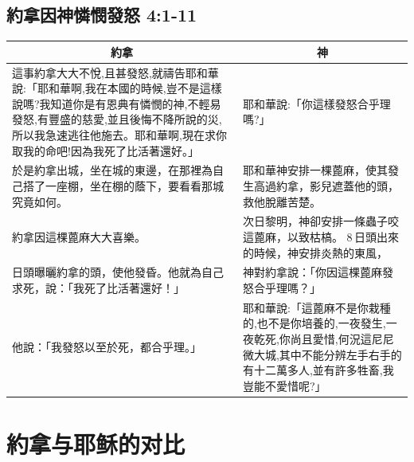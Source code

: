 \subsection{約拿因神憐憫發怒 4:1-11}
\begin{table}[H]
\centering
\begin{tabular}{p{8.25cm}|p{9.25cm}}\hline\hline
\multicolumn{1}{c|}{約拿}&\multicolumn{1}{c}{神}\\\hline
這事約拿大大不悅,且甚發怒,就禱告耶和華說:「耶和華啊,我在本國的時候,豈不是這樣說嗎?我知道你是有恩典有憐憫的神,不輕易發怒,有豐盛的慈愛,並且後悔不降所說的災,所以我急速逃往他施去。耶和華啊,現在求你取我的命吧!因為我死了比活著還好。」&耶和華說:「你這樣發怒合乎理嗎?」\\\hline
於是約拿出城，坐在城的東邊，在那裡為自己搭了一座棚，坐在棚的蔭下，要看看那城究竟如何。&耶和華神安排一棵蓖麻，使其發生高過約拿，影兒遮蓋他的頭，救他脫離苦楚。\\\hline
約拿因這棵蓖麻大大喜樂。&次日黎明，神卻安排一條蟲子咬這蓖麻，以致枯槁。 8 日頭出來的時候，神安排炎熱的東風，\\\hline
日頭曝曬約拿的頭，使他發昏。他就為自己求死，說：「我死了比活著還好！」&神對約拿說：「你因這棵蓖麻發怒合乎理嗎？」\\\hline
他說：「我發怒以至於死，都合乎理。」&耶和華說:「這蓖麻不是你栽種的,也不是你培養的,一夜發生,一夜乾死,你尚且愛惜,何況這尼尼微大城,其中不能分辨左手右手的有十二萬多人,並有許多牲畜,我豈能不愛惜呢?」\\\hline
\end{tabular}
\end{table}
 




\section{約拿与耶稣的对比}











